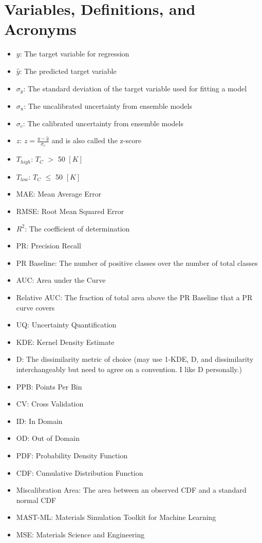 \section{Variables, Definitions, and Acronyms}

\begin{itemize}
    \item $y$: The target variable for regression
    \item $\hat{y}$: The predicted target variable
    \item $\sigma_{y}$: The standard deviation of the target variable used for fitting a model
    \item $\sigma_{u}$: The uncalibrated uncertainty from ensemble models
    \item $\sigma_{c}$: The calibrated uncertainty from ensemble models
    \item $z$: $z=\frac{y-\hat{y}}{\sigma_{c}}$ and is also called the z-score
    \item $T_{high}$: $T_{C}$ $>$ 50 $[K]$
    \item $T_{low}$: $T_{C}$ $\leq$ 50 $[K]$
    \item MAE: Mean Average Error
    \item RMSE: Root Mean Squared Error
    \item $R^{2}$: The coefficient of determination
    \item PR: Precision Recall
    \item PR Baseline: The number of positive classes over the number of total classes
    \item AUC: Area under the Curve
    \item Relative AUC: The fraction of total area above the PR Baseline that a PR curve covers
    \item UQ: Uncertainty Quantification
    \item KDE: Kernel Density Estimate
    \item D: The dissimilarity metric of choice (may use 1-KDE, D, and dissimilarity interchangeably but need to agree on a convention. I like D personally.)
    \item PPB: Points Per Bin
    \item CV: Cross Validation
    \item ID: In Domain
    \item OD: Out of Domain
    \item PDF: Probability Density Function
    \item CDF: Cumulative Distribution Function
    \item Miscalibration Area: The area between an observed CDF and a standard normal CDF
    \item MAST-ML: Materials Simulation Toolkit for Machine Learning
    \item MSE: Materials Science and Engineering
\end{itemize}